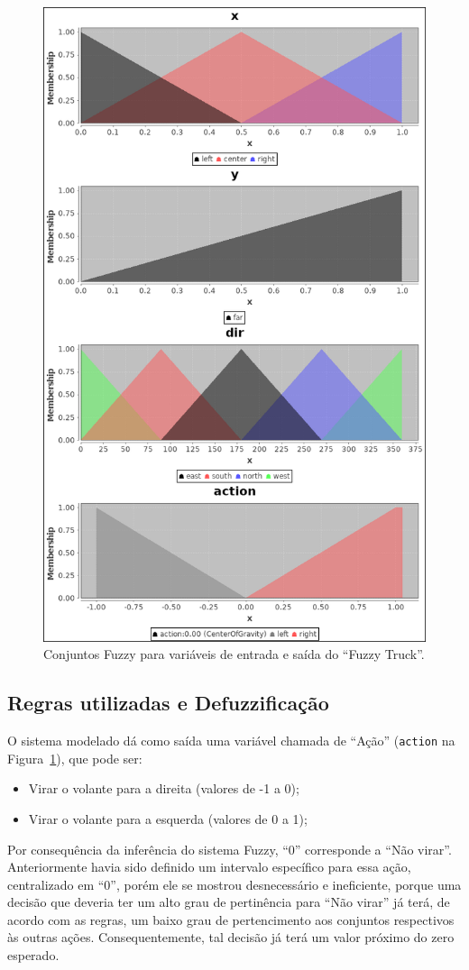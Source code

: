 \documentclass[twocolumn]{article}
\begin{document}
    \begin{figure}[ht]
        \centering{}
        \includegraphics[keepaspectratio,width=.5\textwidth]{img/truck-fuzzifiers}
        \caption{%
            Conjuntos Fuzzy para variáveis de entrada e saída do ``Fuzzy
            Truck''.\label{fuzzy-sets}
        }
    \end{figure}

    \subsection{Regras utilizadas e Defuzzificação}

    O sistema modelado dá como saída uma variável chamada de ``Ação''
    (\texttt{action} na Figura~\ref{fuzzy-sets}), que pode ser:

    \begin{itemize}
        \item Virar o volante para a direita (valores de -1 a 0);
        \item Virar o volante para a esquerda (valores de 0 a 1);
    \end{itemize}

    Por consequência da inferência do sistema Fuzzy, ``0'' corresponde a ``Não
    virar''. Anteriormente havia sido definido um intervalo específico para
    essa ação, centralizado em ``0'', porém ele se mostrou desnecessário e
    ineficiente, porque uma decisão que deveria ter um alto grau de pertinência
    para ``Não virar'' já terá, de acordo com as regras, um baixo grau de
    pertencimento aos conjuntos respectivos às outras ações. Consequentemente,
    tal decisão já terá um valor próximo do zero esperado.
\end{document}
